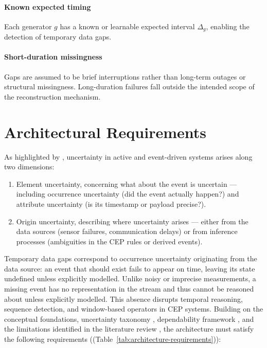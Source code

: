 \paragraph*{Known expected timing}
Each generator \(g\) has a known or learnable expected interval \(\Delta_g\), enabling the detection of temporary data gaps.

\paragraph*{Short-duration missingness}
Gaps are assumed to be brief interruptions rather than long-term outages or structural missingness. Long-duration failures fall outside the intended scope of the reconstruction mechanism.



\section{Architectural Requirements}\label{sec:architecture-reqs}
As highlighted by \citet{wasserkrug2006taxonomy}, uncertainty in active and event-driven systems arises along two dimensions:

\begin{enumerate}
    \item Element uncertainty, concerning what about the event is uncertain — including occurrence uncertainty (did the event actually happen?) and attribute uncertainty (is its timestamp or payload precise?).
    \item Origin uncertainty, describing where uncertainty arises — either from the data sources (sensor failures, communication delays) or from inference processes (ambiguities in the CEP rules or derived events).
\end{enumerate}




Temporary data gaps correspond to occurrence uncertainty originating from the data source: an event that should exist fails to appear on time, leaving its state undefined unless explicitly modelled. Unlike noisy or imprecise measurements, a missing event has no representation in the stream and thus cannot be reasoned about unless explicitly modelled. This absence disrupts temporal reasoning, sequence detection, and window-based operators in CEP systems. Building on the conceptual foundations, uncertainty taxonomy \cite{wasserkrug2006taxonomy}, dependability framework \cite{avizienis2004basic}, and the limitations identified in the literature review , the architecture must satisfy the following requirements ((Table~\ref{tab:architecture-requirements})):


